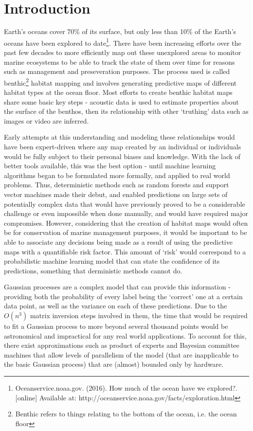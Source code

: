 \chapter{Introduction}

Earth's oceans cover 70\% of its surface, but only less than 10\% of the Earth's oceans have been explored to date\footnote{Oceanservice.noaa.gov. (2016). How much of the ocean have we explored?. [online] Available at: http://oceanservice.noaa.gov/facts/exploration.html}. There have been increasing efforts over the past few decades to more efficiently map out these unexplored areas to monitor marine ecosystems to be able to track the state of them over time for reasons such as management and preseveration purposes. The process used is called benthic\footnote{Benthic refers to things relating to the bottom of the ocean, i.e. the ocean floor} habitat mapping and involves generating predictive maps of different habitat types at the ocean floor. Most efforts to create benthic habitat maps share some basic key steps - acoustic data is used to estimate properties about the surface of the benthos, then its relationship with other `truthing' data such as images or video are inferred. 

Early attempts at this understanding and modeling these relationships would have been expert-driven where any map created by an individual or individuals would be fully subject to their personal biases and knowledge. With the lack of better tools available, this was the best option - until machine learning algorithms began to be formulated more formally, and applied to real world problems. Thus, deterministic methods such as random forests and support vector machines made their debut, and enabled predictions on large sets of potentially complex data that would have previously proved to be a considerable challenge or even impossible when done manually, and would have required major compromises. 
However, considering that the creation of habitat maps would often be for conservation of marine management purposes, it would be important to be able to associate any decisions being made as a result of using the predictive maps with a quantifiable risk factor. This amount of `risk' would correspond to a probabilistic machine learning model that can state the confidence of its predictions, something that derministic methods cannot do.

Gaussian processes are a complex model that can provide this information - providing both the probability of every label being the `correct' one at a certain data point, as well as the variance on each of these predictions. Due to the $O(n^3)$ matrix inversion steps involved in them, the time that would be required to fit a Gaussian process to more beyond several thousand points would be astronomical and impractical for any real world applications. To account for this, there exist approximations such as product of experts and Bayesian committee machines that allow levels of parallelism of the model (that are inapplicable to the basic Gaussian process) that are (almost) bounded only by hardware. 

